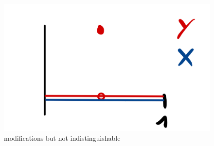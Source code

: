 \begin{figure}[h]
	\begin{center}
		\includegraphics[scale=0.07]{unique.jpeg}
		\caption*{modifications but not indistinguishable}
	\end{center}
	\end{figure}

